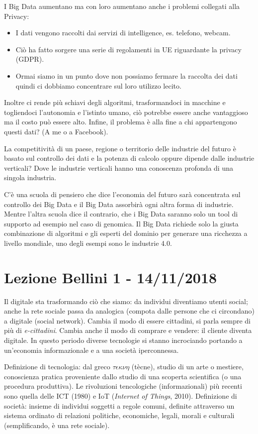 \documentclass[a4page, 11pt]{article}
\begin{document}
I Big Data aumentano ma con loro aumentano anche i problemi collegati alla Privacy:
\begin{itemize}
	\item I dati vengono raccolti dai servizi di intelligence, es. telefono, webcam.
	\item Ciò ha fatto sorgere una serie di regolamenti in UE riguardante la privacy (GDPR).
	\item Ormai siamo in un punto dove non possiamo fermare la raccolta dei dati quindi ci dobbiamo concentrare sul loro utilizzo lecito.
\end{itemize}
Inoltre ci rende più schiavi degli algoritmi, trasformandoci in macchine e togliendoci l’autonomia e l’istinto umano, ciò potrebbe essere anche vantaggioso ma il costo può essere alto. Infine, il problema è alla fine a chi appartengono questi dati? (A me o a Facebook).

La competitività di un paese, regione o territorio delle industrie del futuro è basato sul controllo dei dati e la potenza di calcolo oppure dipende dalle industrie verticali? Dove le industrie verticali hanno una conoscenza profonda di una singola industria.
 
C’è una scuola di pensiero che dice l’economia del futuro sarà concentrata sul controllo dei Big Data e il Big Data assorbirà ogni altra forma di industrie. Mentre l’altra scuola dice il contrario, che i Big Data saranno solo un tool di supporto ad esempio nel caso di genomica. Il Big Data richiede solo la giusta combinazione di algoritmi e gli esperti del dominio per generare una ricchezza a livello mondiale, uno degli esempi sono le industrie 4.0.

\section*{Lezione Bellini 1 - 14/11/2018}
Il digitale sta trasformando ciò che siamo: da individui diventiamo utenti social; anche la rete sociale passa da analogica (compota dalle persone che ci circondano) a digitale (social network).
Cambia il modo di essere cittadini, si parla sempre di più di \textit{e-cittadini}.
Cambia anche il modo di comprare e vendere: il cliente diventa digitale.
In questo periodo diverse tecnologie si stanno incrociando portando a un'economia informazionale e a una società iperconnessa.

Definizione di tecnologia: dal greco $\tau\epsilon\kappa\nu\eta$ (tècne), studio di un arte o mestiere, conoscienza pratica proveniente dallo studio di una scoperta scientifica (o una procedura produttiva).
Le rivoluzioni tencologiche (informazionali) più recenti sono quella delle ICT (1980) e IoT (\textit{Internet of Things}, 2010). \newline
Definizione di società: insieme di individui soggetti a regole comuni, definite attraverso un sistema ordinato di relazioni politiche, economiche, legali, morali e culturali (semplificando, è una rete sociale).
\end{document}
